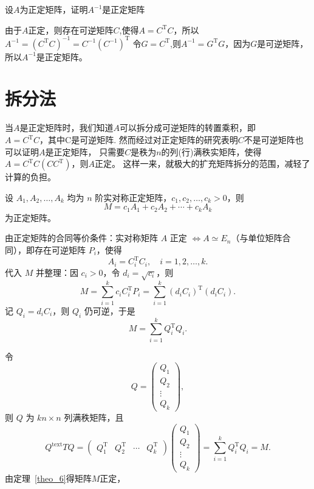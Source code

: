 \begin{example}
  设$A$为正定矩阵，证明$A^{-1}$是正定矩阵
\end{example}
\begin{solution}
  由于$A$正定，则存在可逆矩阵$C$,使得$A=C^\mathrm{T}C$，所以$A^{-1}=(C^\mathrm{T}C)^{-1}=C^{-1}(C^{-1})^\mathrm{T}$
  令$G=C^\mathrm{T}$,则$A^{-1}=G^\mathrm{T}G$，因为$G$是可逆矩阵，所以$A^{-1}$是正定矩阵。
\end{solution}
\section{拆分法}\label{2_6}
当$A$是正定矩阵时，我们知道$A$可以拆分成可逆矩阵的转置乘积，即\\$A=C^\mathrm{T}C，\text{其中C是可逆矩阵}$.
然而经过对正定矩阵的研究表明$C$不是可逆矩阵也可以证明$A$是正定矩阵，
只需要$C$是秩为$n$的列(行)满秩实矩阵，使得$A=C^\mathrm{T}C(CC^\mathrm{T})$，则$A$正定。
这样一来，就极大的扩充矩阵拆分的范围，减轻了计算的负担。
\begin{example}
  设 $A_1,A_2,\dots,A_k$ 均为 $n$ 阶实对称正定矩阵，$c_1,c_2,\dots,c_k>0$，则
\[
M = c_1A_1 + c_2A_2 + \cdots + c_kA_k
\]
为正定矩阵。
\end{example}
\begin{solution}
    由正定矩阵的合同等价条件：实对称矩阵 $A$ 正定 $\iff A \simeq E_n$（与单位矩阵合同），即存在可逆矩阵 $P_i$，使得
    \[
    A_i = C_i^\mathrm{T} C_i,\quad i=1,2,\dots,k.
    \]代入 $M$ 并整理：因 $c_i>0$，令 $d_i=\sqrt{c_i}$，则
    \[
    M = \sum_{i=1}^k c_i C_i^\mathrm{T} P_i
        = \sum_{i=1}^k (d_i C_i)^\mathrm{T} (d_i C_i).
    \]
    记 $Q_i = d_i C_i$，则 $Q_i$ 仍可逆，于是
    \[
    M = \sum_{i=1}^k Q_i^\mathrm{T} Q_i.
    \]
    
    令
    \[
    Q = \begin{pmatrix} Q_1 \\ Q_2 \\ \vdots \\ Q_k \end{pmatrix},
    \]
    则 $Q$ 为 $kn\times n$ 列满秩矩阵，且
    \[
    Q^\mathrm{text}{T} Q = \begin{pmatrix} Q_1^\mathrm{T} & Q_2^\mathrm{T} & \cdots & Q_k^\mathrm{T} \end{pmatrix}
                \begin{pmatrix} Q_1 \\ Q_2 \\ \vdots \\ Q_k \end{pmatrix}
                = \sum_{i=1}^k Q_i^\mathrm{T} Q_i = M.
    \]
    由定理~\ref{theo_6}得矩阵$M$正定，
\end{solution}
